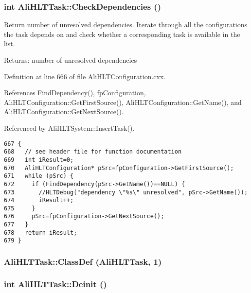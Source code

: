 \subsubsection{\setlength{\rightskip}{0pt plus 5cm}int Ali\-HLTTask::Check\-Dependencies ()}\label{classAliHLTTask_a13}


Return number of unresolved dependencies. Iterate through all the configurations the task depends on and check whether a corresponding task is available in the list. \begin{Desc}
\item[Returns:]number of unresolved dependencies \end{Desc}


Definition at line 666 of file Ali\-HLTConfiguration.cxx.

References Find\-Dependency(), fp\-Configuration, Ali\-HLTConfiguration::Get\-First\-Source(), Ali\-HLTConfiguration::Get\-Name(), and Ali\-HLTConfiguration::Get\-Next\-Source().

Referenced by Ali\-HLTSystem::Insert\-Task().

\footnotesize\begin{verbatim}667 {
668   // see header file for function documentation
669   int iResult=0;
670   AliHLTConfiguration* pSrc=fpConfiguration->GetFirstSource();
671   while (pSrc) {
672     if (FindDependency(pSrc->GetName())==NULL) {
673       //HLTDebug("dependency \"%s\" unresolved", pSrc->GetName());
674       iResult++;
675     }
676     pSrc=fpConfiguration->GetNextSource();
677   }
678   return iResult;
679 }
\end{verbatim}\normalsize 


\subsubsection{\setlength{\rightskip}{0pt plus 5cm}Ali\-HLTTask::Class\-Def ({\bf Ali\-HLTTask}, 1)\hspace{0.3cm}{\tt  [private]}}\label{classAliHLTTask_d0}


\subsubsection{\setlength{\rightskip}{0pt plus 5cm}int Ali\-HLTTask::Deinit ()}\label{classAliHLTTask_a6}


